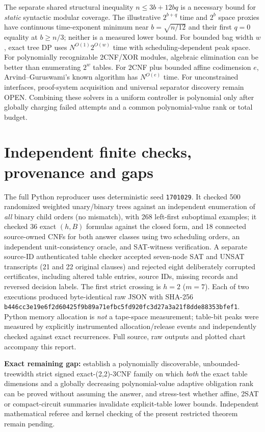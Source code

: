\documentclass[11pt]{article}
\begin{document}
The separate shared structural inequality $n\le3b+12bq$ is a necessary bound for \emph{static} syntactic modular coverage. The illustrative $2^{b+q}$ time and $2^b$ space proxies have continuous time-exponent minimum near $b=\sqrt{n/12}$ and their first $q=0$ equality at $b\ge n/3$; neither is a measured lower bound. For bounded bag width $w$, exact tree DP uses $N^{O(1)}2^{O(w)}$ time with scheduling-dependent peak space. For polynomially recognizable 2CNF/XOR modules, algebraic elimination can be better than enumerating $2^w$ tables. For 2CNF plus bounded affine codimension $e$, Arvind--Guruswami's known algorithm has $N^{O(e)}$ time. For unconstrained interfaces, proof-system acquisition and universal separator discovery remain OPEN. Combining these solvers in a uniform controller is polynomial only after globally charging failed attempts and a common polynomial-value rank or total budget.

\section{Independent finite checks, provenance and gaps}
The full Python reproducer uses deterministic seed \texttt{1701029}. It checked 500 randomized weighted unary/binary trees against an independent enumeration of \emph{all} binary child orders (no mismatch), with 268 left-first suboptimal examples; it checked 36 exact $(h,B)$ formulas against the closed form, and 18 connected source-owned CNFs for both answer classes using two scheduling orders, an independent unit-consistency oracle, and SAT-witness verification. A separate source-ID authenticated table checker accepted seven-node SAT and UNSAT transcripts (21 and 22 original clauses) and rejected eight deliberately corrupted certificates, including altered table entries, source IDs, missing records and reversed decision labels. The first strict crossing is $h=2$ ($m=7$). Each of two executions produced byte-identical raw JSON with SHA-256 \texttt{b446cc3e19e6f2d60425f9b89a71efbc5fd920fc3d27a3a21f8dde88353bfef1}. Python memory allocation is \emph{not} a tape-space measurement; table-bit peaks were measured by explicitly instrumented allocation/release events and independently checked against exact recurrences. Full source, raw outputs and plotted chart accompany this report.

\noindent\textbf{Exact remaining gap:} establish a polynomially discoverable, unbounded-treewidth strict signed exact-(2,2)-3CNF family on which \emph{both} the exact table dimensions and a globally decreasing polynomial-value adaptive obligation rank can be proved without assuming the answer, and stress-test whether affine, 2SAT or compact-circuit summaries invalidate explicit-table lower bounds. Independent mathematical referee and kernel checking of the present restricted theorem remain pending.
\end{document}
